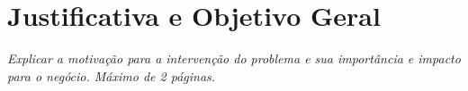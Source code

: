 \section{Justificativa e Objetivo Geral}

\textit{Explicar a motivação para a intervenção do problema e sua importância e impacto para o negócio. Máximo de 2 páginas.}
